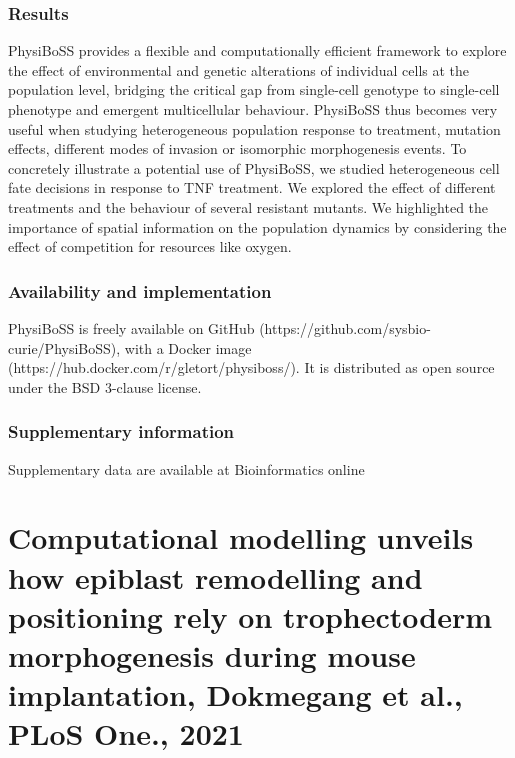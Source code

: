 \documentclass[11pt,a4paper]{article}
\begin{document}
\subsubsection*{Results}
PhysiBoSS provides a flexible and computationally efficient framework to explore the effect of environmental and genetic alterations of individual cells at the population level, bridging the critical gap from single-cell genotype to single-cell phenotype and emergent multicellular behaviour. PhysiBoSS thus becomes very useful when studying heterogeneous population response to treatment, mutation effects, different modes of invasion or isomorphic morphogenesis events. To concretely illustrate a potential use of PhysiBoSS, we studied heterogeneous cell fate decisions in response to TNF treatment. We explored the effect of different treatments and the behaviour of several resistant mutants. We highlighted the importance of spatial information on the population dynamics by considering the effect of competition for resources like oxygen.

\subsubsection*{Availability and implementation}
PhysiBoSS is freely available on GitHub (https://github.com/sysbio-curie/PhysiBoSS), with a Docker image (https://hub.docker.com/r/gletort/physiboss/). It is distributed as open source under the BSD 3-clause license.

\subsubsection*{Supplementary information}
Supplementary data are available at Bioinformatics online 

\section*{Computational modelling unveils how epiblast remodelling and positioning rely on trophectoderm morphogenesis during mouse implantation, Dokmegang et al., PLoS One., 2021}
\end{document}
